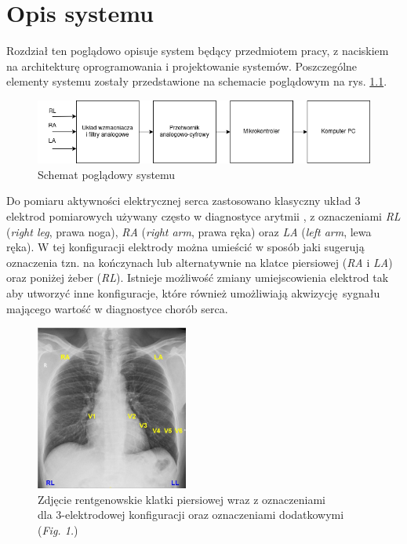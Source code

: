 
\chapter{Opis systemu}

Rozdział ten poglądowo opisuje system będący przedmiotem pracy, z naciskiem na 
architekturę oprogramowania i projektowanie systemów. 
Poszczególne elementy systemu zostały przedstawione na schemacie poglądowym na rys. \ref{fig:hl_sys}.

\begin{figure}[h!]
    \centering
    \includegraphics[scale=0.6]{pl/media/hl_system.png}
    \caption{Schemat poglądowy systemu}
    \label{fig:hl_sys}
\end{figure}

Do pomiaru aktywności elektrycznej serca zastosowano klasyczny układ 3 elektrod pomiarowych używany często
w diagnostyce arytmii \cite{FRANCIS201692}, z oznaczeniami \textit{RL} (\textit{right leg}, prawa noga), 
\textit{RA} (\textit{right arm}, prawa ręka) oraz \textit{LA} (\textit{left arm}, lewa ręka). W tej 
konfiguracji elektrody można umieścić w sposób jaki sugerują oznaczenia tzn. na kończynach lub alternatywnie 
na klatce piersiowej (\textit{RA} i \textit{LA}) oraz poniżej żeber (\textit{RL}). 
Istnieje możliwość zmiany umiejscowienia elektrod tak aby utworzyć inne konfiguracje, które również umożliwiają akwizycję sygnału
mającego wartość w diagnostyce chorób serca.

\begin{figure}[h!]
    \centering 
    \includegraphics[scale=1.2]{pl/media/electrodes.png}
    \caption{Zdjęcie rentgenowskie klatki piersiowej wraz z oznaczeniami\\ dla 3-elektrodowej konfiguracji oraz oznaczeniami dodatkowymi
    \cite{FRANCIS201692}(\textit{Fig. 1.})}
    \label{fig:ele}
\end{figure}

